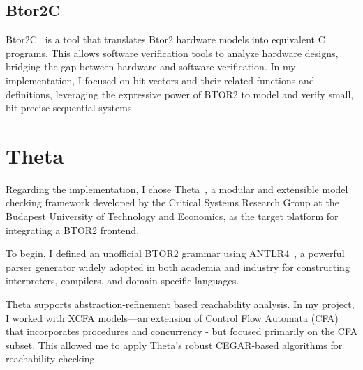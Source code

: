 \subsection{Btor2C}


Btor2C~\cite{btor2c} is a tool that translates Btor2 hardware models into equivalent C programs. This allows software verification tools to analyze hardware designs, bridging the gap between hardware and software verification.
 In my implementation, I focused on bit-vectors and their related functions and definitions, leveraging the expressive power of BTOR2 to model and verify small, bit-precise sequential systems.


\section{Theta}

Regarding the implementation, I chose Theta~\cite{theta}, a modular and extensible model checking framework developed by the Critical Systems Research Group at the Budapest University of Technology and Economics, as the target platform for integrating a BTOR2 frontend.


To begin, I defined an unofficial BTOR2 grammar using ANTLR4~\cite{antlr}, a powerful parser generator widely adopted in both academia and industry for constructing interpreters, compilers, and domain-specific languages.

Theta supports abstraction-refinement based reachability analysis. In my project, I worked with XCFA models—an extension of Control Flow Automata (CFA) that incorporates procedures and concurrency - but focused primarily on the CFA subset. This allowed me to apply Theta's robust CEGAR-based algorithms for reachability checking.

